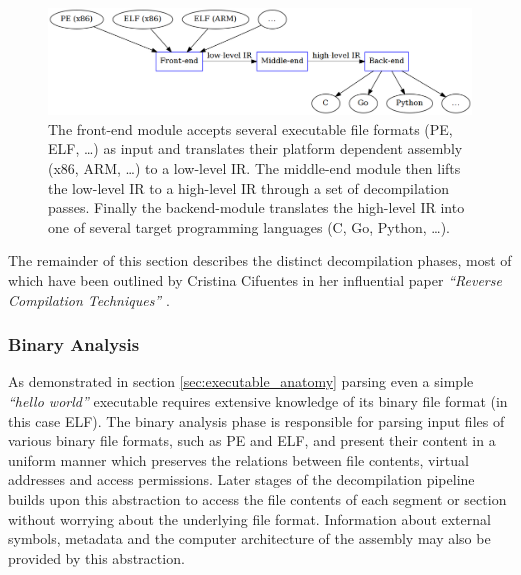\begin{figure}[htbp]
	\begin{center}
		\includegraphics[width=\textwidth]{inc/modules_overview.png}
		\caption{The front-end module accepts several executable file formats (PE, ELF, …) as input and translates their platform dependent assembly (x86, ARM, …) to a low-level IR. The middle-end module then lifts the low-level IR to a high-level IR through a set of decompilation passes. Finally the backend-module translates the high-level IR into one of several target programming languages (C, Go, Python, …).}
		\label{fig:modules_overview}
	\end{center}
\end{figure}

The remainder of this section describes the distinct decompilation phases, most of which have been outlined by Cristina Cifuentes in her influential paper \textit{``Reverse Compilation Techniques''} \cite{rev_comp}.


\subsubsection{Binary Analysis}
\label{sec:binary_analysis}

As demonstrated in section \ref{sec:executable_anatomy} parsing even a simple \textit{``hello world''} executable requires extensive knowledge of its binary file format (in this case ELF). The binary analysis phase is responsible for parsing input files of various binary file formats, such as PE and ELF, and present their content in a uniform manner which preserves the relations between file contents, virtual addresses and access permissions. Later stages of the decompilation pipeline builds upon this abstraction to access the file contents of each segment or section without worrying about the underlying file format. Information about external symbols, metadata and the computer architecture of the assembly may also be provided by this abstraction.


